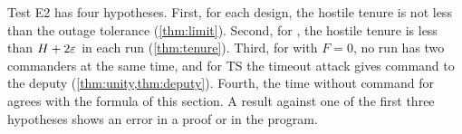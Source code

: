 Test E2 has four hypotheses. First, for each design, the hostile tenure is not less than
the outage tolerance (\cref{thm:limit}). Second, for \sys{}, the hostile tenure is less than
$H + 2\varepsilon$ in each run (\cref{thm:tenure}). Third, for \sys{} with $F = 0$, no run has
two commanders at the same time, and for TS the timeout attack gives command to the deputy
(\cref{thm:unity,thm:deputy}). Fourth, the time without command for \sys{} agrees with the
formula of this section. A result against one of the first three hypotheses shows an error
in a proof or in the program.
